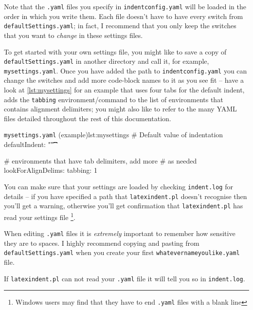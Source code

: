 	Note that the \texttt{.yaml} files you specify in \texttt{indentconfig.yaml} will be
	loaded in the order in which you write them. Each file doesn't have to have every switch
	from \texttt{defaultSettings.yaml}; in fact, I recommend that you only keep the switches that
	you want to \emph{change} in these settings files.

	To get started with your own settings file, you might like to save a copy of
	\texttt{defaultSettings.yaml} in another directory and call it, for example,
	\texttt{mysettings.yaml}. Once you have added the path to \texttt{indentconfig.yaml} you can
	change the switches and add more code-block names to it as you see fit -- have a look at
	\cref{lst:mysettings} for an example that uses four tabs for the default indent, adds
	the \texttt{tabbing} environment/command to the list of environments that contains
	alignment delimiters; you might also like to refer to the many YAML files detailed
	throughout the rest of this documentation.

	\begin{yaml}{\texttt{mysettings.yaml} (example)}{lst:mysettings}
# Default value of indentation
defaultIndent: "\t\t\t\t"

# environments that have tab delimiters, add more
# as needed
lookForAlignDelims:
    tabbing: 1
\end{yaml}

	You can make sure that your settings are loaded by checking \texttt{indent.log} for
	details -- if you have specified a path that \texttt{latexindent.pl} doesn't recognise
	then you'll get a warning, otherwise you'll get confirmation that \texttt{latexindent.pl}
	has read your settings file \footnote{Windows users
		may find that they have to end \texttt{.yaml} files with a blank line}.

	\begin{warning}
		When editing \texttt{.yaml} files it is \emph{extremely} important
		to remember how sensitive they are to spaces. I highly recommend copying
		and pasting from \texttt{defaultSettings.yaml} when you create your
		first \texttt{whatevernameyoulike.yaml} file.

		If \texttt{latexindent.pl} can not read your \texttt{.yaml} file it
		will tell you so in \texttt{indent.log}.
	\end{warning}

